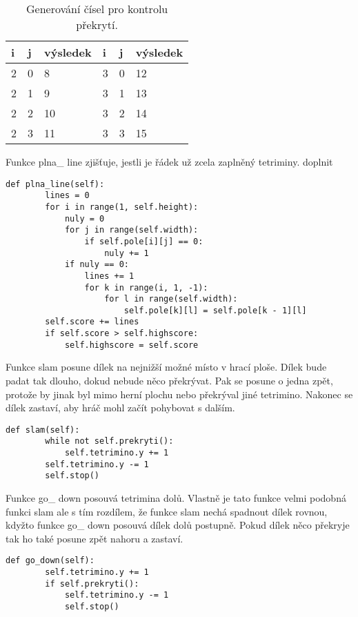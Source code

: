 \documentclass[12pt]{report}			%
\begin{document}
\begin{table}[ht]
\centering
\begin{tabular}{|p{2cm}|p{2cm}|p{2cm}||p{2cm}|p{2cm}|p{2cm}|}
  \hline
  {i} & {j} & {výsledek} & {i} & {j} & {výsledek}\\
  \hline 
  2 & 0 & 8 & 3 & 0 & 12 \\
  \hline 
  2 & 1 & 9 & 3 & 1 & 13\\
  \hline 
  2 & 2 & 10 & 3 & 2 & 14\\
  \hline 
  2 & 3 & 11 & 3 & 3 & 15\\
  \hline 
\end{tabular}
\caption{Generování čísel pro kontrolu překrytí.}
\label{table:ta}
\end{table}
Funkce plna\_ line zjišťuje, jestli je řádek už zcela zaplněný tetriminy.
doplnit
\begin{lstlisting}[title={Program tetris.py}, caption={Funkce plna\_ line}, 							label={lst:tetris.py}]	
    def plna_line(self):
        lines = 0
        for i in range(1, self.height):
            nuly = 0
            for j in range(self.width):
                if self.pole[i][j] == 0:
                    nuly += 1
            if nuly == 0:
                lines += 1
                for k in range(i, 1, -1):
                    for l in range(self.width):
                        self.pole[k][l] = self.pole[k - 1][l]
        self.score += lines
        if self.score > self.highscore:
            self.highscore = self.score
\end{lstlisting}
Funkce slam posune dílek na nejnižší možné místo v hrací ploše. Dílek bude padat tak dlouho, dokud nebude něco překrývat. Pak se posune o jedna zpět, protože by jinak byl mimo herní plochu nebo překrýval jiné tetrimino. Nakonec se dílek zastaví, aby hráč mohl začít pohybovat s dalším.
\begin{lstlisting}[title={Program tetris.py}, caption={Funkce slam}, 							label={lst:tetris.py}]	
    def slam(self):
        while not self.prekryti():
            self.tetrimino.y += 1
        self.tetrimino.y -= 1
        self.stop()
\end{lstlisting}
Funkce go\_ down posouvá tetrimina dolů. Vlastně je tato funkce velmi podobná funkci slam ale s tím rozdílem, že funkce slam nechá spadnout dílek rovnou, kdyžto funkce go\_ down posouvá dílek dolů postupně. Pokud dílek něco překryje tak ho také posune zpět nahoru a zastaví.
\begin{lstlisting}[title={Program tetris.py}, caption={Funkce go\_ down}, 							label={lst:tetris.py}]     
    def go_down(self):
        self.tetrimino.y += 1
        if self.prekryti():
            self.tetrimino.y -= 1
            self.stop()
\end{lstlisting}
\end{document}

